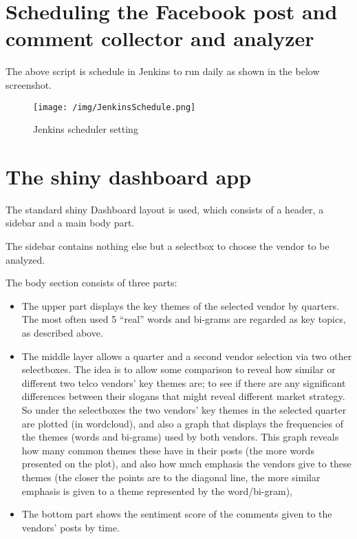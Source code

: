 \documentclass[]{article}
\providecommand{\tightlist}{%
  \setlength{\itemsep}{0pt}\setlength{\parskip}{0pt}}
\begin{document}
\section{Scheduling the Facebook post and comment collector and
analyzer}\label{scheduling-the-facebook-post-and-comment-collector-and-analyzer}

The above script is schedule in Jenkins to run daily as shown in the
below screenshot.

\begin{figure}[htbp]
\centering
\texttt{[image: /img/JenkinsSchedule.png]}
\caption{Jenkins scheduler setting}
\end{figure}

\section{The shiny dashboard app}\label{the-shiny-dashboard-app}

The standard shiny Dashboard layout is used, which consists of a header,
a sidebar and a main body part.

The sidebar contains nothing else but a selectbox to choose the vendor
to be analyzed.

The body section consists of three parts:

\begin{itemize}
\tightlist
\item
  The upper part displays the key themes of the selected vendor by
  quarters. The most often used 5 ``real'' words and bi-grams are
  regarded as key topics, as described above.
\item
  The middle layer allows a quarter and a second vendor selection via
  two other selectboxes. The idea is to allow some comparison to reveal
  how similar or different two telco vendors' key themes are; to see if
  there are any significant differences between their slogans that might
  reveal different market strategy. So under the selectboxes the two
  vendors' key themes in the selected quarter are plotted (in
  wordcloud), and also a graph that displays the frequencies of the
  themes (words and bi-grams) used by both vendors. This graph reveals
  how many common themes these have in their posts (the more words
  presented on the plot), and also how much emphasis the vendors give to
  these themes (the closer the points are to the diagonal line, the more
  similar emphasis is given to a theme represented by the word/bi-gram),
\item
  The bottom part shows the sentiment score of the comments given to the
  vendors' posts by time.
\end{itemize}
\end{document}
